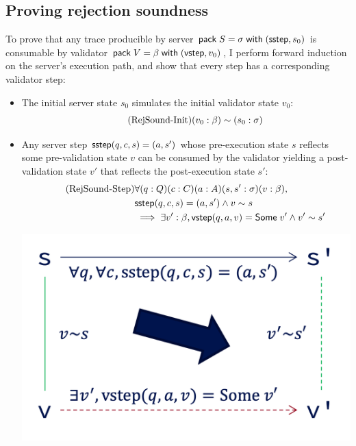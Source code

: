 \subsection{Proving rejection soundness}
To prove that any trace producible by server $\mathsf{pack}\;S=\sigma\;\mathsf{with}\;(\mathsf{sstep},s_0)$
is consumable by validator $\mathsf{pack}\;V=\beta\;\mathsf{with}\;(\mathsf{vstep},v_0)$, I perform forward
induction on the server's execution path, and show that every step has a
corresponding validator step:
\begin{itemize}
\item The initial server state $s_0$ simulates the initial validator state $v_0$:
  \begin{equation}
    \tag{RejSound-Init}
    \label{eq:rs1}
    (v_0:\beta)\sim (s_0:\sigma)
  \end{equation}
\item Any server step $\mathsf{sstep}(q,c,s)=(a,s')$ whose pre-execution state $s$
  reflects some pre-validation state $v$ can be consumed by the validator
  yielding a post-validation state $v'$ that reflects the post-execution state $s'$:
  \begin{align*}
    \tag{RejSound-Step}
    \label{eq:rs2}
    &\forall(q:Q)(c:C)(a:A)(s,s':\sigma)(v:\beta),\\
    &\mathsf{sstep}(q,c,s)=(a,s')\wedge v\sim s\\
    &\implies\exists v':\beta,\mathsf{vstep}(q,a,v)=\mathsf{Some}\;v'\wedge v'\sim s'
  \end{align*}
  \begin{center}
    \includegraphics[width=.5\textwidth]{figures/sound}
  \end{center}
\end{itemize}

